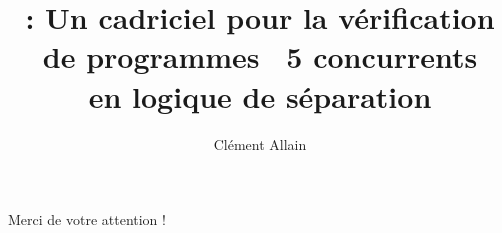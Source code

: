 \documentclass[aspectratio=169, xcolor=dvipsnames]{beamer}
\title{
  \Zoo: Un cadriciel pour la vérification \\
  de programmes \OCaml~5 concurrents \\
  en logique de séparation
}
\author{
  Clément Allain
}
\begin{document}

\begin{frame}
\titlepage
\end{frame}







\begin{frame}
\centering
\huge
Merci de votre attention !
\end{frame}

\end{document}
